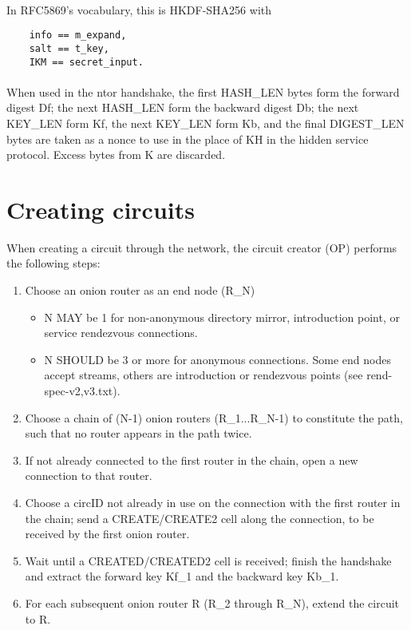 \paragraph{}
In RFC5869's vocabulary, this is HKDF-SHA256 with

\begin{verbatim}
    info == m_expand,
    salt == t_key,
    IKM == secret_input.
\end{verbatim}

\paragraph{}
When used in the ntor handshake, the first HASH\_LEN bytes form the
forward digest Df; the next HASH\_LEN form the backward digest Db; the
next KEY\_LEN form Kf, the next KEY\_LEN form Kb, and the final
DIGEST\_LEN bytes are taken as a nonce to use in the place of KH in the
hidden service protocol. Excess bytes from K are discarded.

\section{Creating circuits}

When creating a circuit through the network, the circuit creator
(OP) performs the following steps:

\begin{enumerate}
    \item Choose an onion router as an end node (R\_N)
    \begin{itemize}
        \item N MAY be 1 for non-anonymous directory mirror, introduction point,
        or service rendezvous connections.
        \item N SHOULD be 3 or more for anonymous connections.
        Some end nodes accept streams, others are introduction
        or rendezvous points (see rend-spec-{v2,v3}.txt).
    \end{itemize}
    \item Choose a chain of (N-1) onion routers (R\_1...R\_N-1) to constitute
    the path, such that no router appears in the path twice.

    \item If not already connected to the first router in the chain,
    open a new connection to that router.

    \item Choose a circID not already in use on the connection with the
    first router in the chain; send a CREATE/CREATE2 cell along
    the connection, to be received by the first onion router.

    \item Wait until a CREATED/CREATED2 cell is received; finish the
    handshake and extract the forward key Kf\_1 and the backward
    key Kb\_1.

    \item For each subsequent onion router R (R\_2 through R\_N), extend
    the circuit to R.
\end{enumerate}

